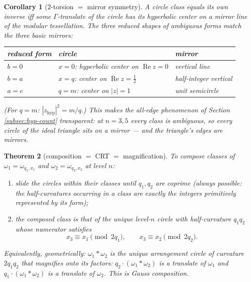 \documentclass[11pt]{amsart}
\numberwithin{equation}{section}
\theoremstyle{plain}
\newtheorem{theorem}{Theorem}[section]
\newtheorem{corollary}[theorem]{Corollary}
\theoremstyle{definition}
\theoremstyle{remark}
\newcommand{\re}{\operatorname{Re}}
\begin{document}
\begin{corollary}[$2$-torsion $=$ mirror symmetry]\label{cor:2torsion}
A circle class equals its own inverse iff some
$\Gamma$-translate of the circle has its hyperbolic center on a mirror
line of the modular tessellation.  The three reduced shapes of
ambiguous forms match the three basic mirrors:
\begin{center}
\begin{tabular}{@{}lll@{}}
\toprule
reduced form & circle & mirror \\
\midrule
$b = 0$ & $x = 0$: hyperbolic center on $\re z = 0$ & vertical line \\
$b = a$ & $x = q$: center on $\re z = \tfrac12$ & half-integer
vertical \\
$a = c$ & $q = m$: center on $|z| = 1$ & unit semicircle \\
\bottomrule
\end{tabular}
\end{center}
(For $q = m$: $|z_{\mathrm{hyp}}|^2 = m/q$.)  This makes the all-edge
phenomenon of Section \ref{subsec:hyp-count} transparent: at
$n = 3, 5$ every class is ambiguous, so every circle of the ideal
triangle sits on a mirror --- and the triangle's edges are mirrors.
\end{corollary}

\begin{theorem}[composition $=$ CRT $=$ magnification]
\label{thm:composition}
To compose classes of $\omega_1 = \omega_{q_1, x_1}$ and
$\omega_2 = \omega_{q_2, x_2}$ at level $n$:
\begin{enumerate}
\item slide the circles within their classes until $q_1, q_2$ are
coprime (always possible: the half-curvatures occurring in a class are
exactly the integers primitively represented by its form);
\item the composed class is that of the unique level-$n$ circle with
half-curvature $q_1q_2$ whose numerator satisfies
\[
  x_3 \equiv x_1 \pmod{2q_1}, \qquad x_3 \equiv x_2 \pmod{2q_2}.
\]
\end{enumerate}
Equivalently, geometrically: $\omega_1 * \omega_2$ is the unique
arrangement circle of curvature $2q_1q_2$ that \emph{magnifies onto its
factors}: $q_2\cdot(\omega_1 * \omega_2)$ is a translate of $\omega_1$
and $q_1\cdot(\omega_1 * \omega_2)$ is a translate of $\omega_2$.  This
is Gauss composition.
\end{theorem}
\end{document}
